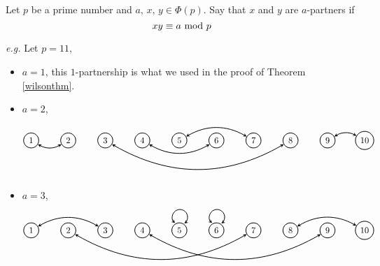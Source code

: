 \vspace*{1.5em}

\begin{definition}
Let $p$ be a prime number and $a,\,x,\,y \in \Phi(p)$. Say that $x$ and $y$ are $a$-partners if
\[xy \equiv a \text{ mod }{p}\]
\end{definition}
\emph{e.g.} Let $p = 11$,
\begin{itemize}[leftmargin=*,itemsep=2em]
\item[] $a=1$, this $1$-partnership is what we used in the proof of Theorem \ref{wilsonthm}.
\item[] $a = 2$,
\[\begin{tikzpicture}[<->,>=stealth,auto,node distance=1.5cm,
  thick,main node/.style={circle,draw}]

  \node[main node] (1) {$1$};
  \node[main node] (2) [right of=1] {$2$};
  \node[main node] (3) [right of=2] {$3$};
  \node[main node] (4) [right of=3] {$4$};
  \node[main node] (5) [right of=4] {$5$};
  \node[main node] (6) [right of=5] {$6$};
  \node[main node] (7) [right of=6] {$7$};
  \node[main node] (8) [right of=7] {$8$};
  \node[main node] (9) [right of=8] {$9$};
  \node[main node] (10) [right of=9] {$10$};
  \path[every node/.style={font=\sffamily\small}]
    (1) edge[bend right] node[] {} (2)
    (3) edge[bend right] node[] {} (8)
    (5) edge[bend left] node[] {} (7)
    (9) edge[bend left] node[] {} (10)
    (4) edge[bend right] node[] {} (6);
\end{tikzpicture}\]
\item[] $a = 3$,
\[\begin{tikzpicture}[<->,>=stealth,auto,node distance=1.5cm,
  thick,main node/.style={circle,draw}]

  \node[main node] (1) {$1$};
  \node[main node] (2) [right of=1] {$2$};
  \node[main node] (3) [right of=2] {$3$};
  \node[main node] (4) [right of=3] {$4$};
  \node[main node] (5) [right of=4] {$5$};
\draw[]	([shift=(120:0.35cm)]5) arc (230:-55:3.1mm) node[] {} (5);
  \node[main node] (6) [right of=5] {$6$};
  \node[main node] (7) [right of=6] {$7$};
  \node[main node] (8) [right of=7] {$8$};
  \node[main node] (9) [right of=8] {$9$};
  \node[main node] (10) [right of=9] {$10$};
\draw[]	([shift=(120:0.35cm)]6) arc (230:-55:3.1mm) node[] {} (6);
  \path[every node/.style={font=\sffamily\small}]
    (1) edge[bend left] node[] {} (3)
    (4) edge[bend right] node[] {} (9)
    (8) edge[bend left] node[] {} (10)
    (2) edge[bend right] node[] {} (7);
\end{tikzpicture}\]
\end{itemize}

